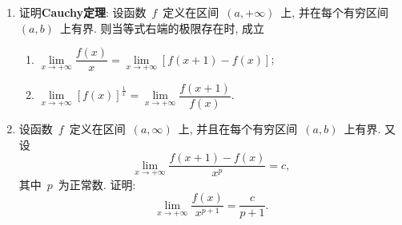 \documentclass[UTF8,a4paper,20pt]{article}
\begin{document}
\begin{enumerate}[1.]
{\heiti 证明}\\
	必要性: ~$f$~是渐进~$T$~周期函数, 故存在~$T$~周期函数~$g$~使成立
	\[ \lim\limits_{x\to+\infty} (f(x)-g(x))=0.\]
	对于任意~$\varepsilon>0$, 存在相应的~$M>0$, 使得当~$x>M$~时, $|f(x)-g(x)|<\dfrac{\varepsilon}{2}$. 对于给定的~$\varepsilon>0$, 当~$m,n>N=\dfrac{M}{T}$~时, $x+mT,x+nT>M$, 
	{\setlength\abovedisplayskip{1pt}
	\setlength\belowdisplayskip{1pt}
	\begin{equation*}
		\begin{split}
			&|f(x+mT)-f(x+nT)|\\
			=&|[f(x+mT)-g(x)]+[g(x)-f(x+nT)]|\\
			\leqslant & |f(x+mT)-g(x)|+|f(x+nT)-g(x)|\\
			=&|f(x+mT)-g(x+mT)|+|f(x+nT)-g(x+nT)|\\
			<&\dfrac{\varepsilon}{2}+\dfrac{\varepsilon}{2}\\
			=&\varepsilon.
		\end{split}
	\end{equation*}
	}
	即$\lim\limits_{m,n\to\infty} [f(x+mT)-f(x+nT)]=0, \quad \forall x>a.$ 其中第二个``=''是由于~$g(x)$~是~$T$~周期函数, 故~$g(x)=g(x+mT)=g(x+nT)$.

	充分性: ~$\lim\limits_{m,n\to\infty} [f(x+mT)-f(x+nT)]=0, \quad \forall x>a$. 故对于任意的~$\varepsilon>0$, 存在相应~$\bar{N}_x>0$, 当~$m,n>\bar{N}_x$~时,
	\[ |f(x+mT)-f(x+nT)|<\varepsilon, \quad \forall x>a.\]
故由Cauchy收敛准则知对于~$\forall x>a$, 数列~$\{f(x+nT)\}$~收敛, 做映射
	{\setlength\abovedisplayskip{1pt}
	\setlength\belowdisplayskip{1pt}
	\begin{equation*}
		\begin{split}
			g: (a,+\infty) \quad &\mapsto \quad \mathbb{R}\\
			   x \quad &\to \quad g(x)=\lim\limits_{n\to\infty} f(x+nT)
		\end{split}
	\end{equation*}
	}
而~$g(x+T)=\lim\limits_{n\to\infty} f[(x+T)+nT]=\lim\limits_{n\to\infty} f[x+(n+1)T] =\lim\limits_{n\to\infty}f(x+nT)=g(x)$, 即~$g(x)$~是~$(a,+\infty)$~上的~$T$~周期函数. 

\item 证明{\bf Cauchy定理}: 设函数~$f$~定义在区间~$(a,+\infty)$~上, 并在每个有穷区间~$(a,b)$~上有界. 则当等式右端的极限存在时, 成立
	\begin{enumerate}[(1)]
	\item $\lim\limits_{x\to+\infty}  \dfrac{f(x)}{x}=\lim\limits_{x\to+\infty}[f(x+1)-f(x)]$;	
	\item $\lim\limits_{x\to+\infty} [f(x)]^{\frac{1}{x}}=\lim\limits_{x\to+\infty} \dfrac{f(x+1)}{f(x)}$.
	\end{enumerate}

\item 设函数~$f$~定义在区间~$(a,\infty)$~上, 并且在每个有穷区间~$(a,b)$~上有界. 又设
\[ \lim\limits_{x\to+\infty} \dfrac{f(x+1)-f(x)}{x^p}=c,\]
其中~$p$~为正常数. 证明:
\[ \lim\limits_{x\to+\infty} \dfrac{f(x)}{x^{p+1}}=\dfrac{c}{p+1}.\]
\end{enumerate}
\end{document}

